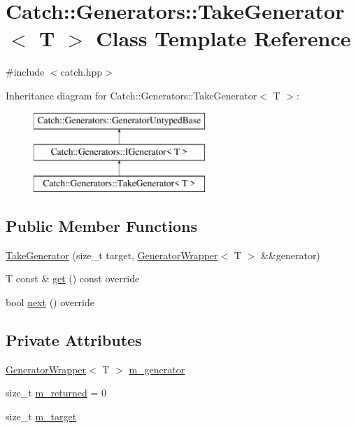\hypertarget{class_catch_1_1_generators_1_1_take_generator}{}\section{Catch\+::Generators\+::Take\+Generator$<$ T $>$ Class Template Reference}
\label{class_catch_1_1_generators_1_1_take_generator}


{\ttfamily \#include $<$catch.\+hpp$>$}

Inheritance diagram for Catch\+::Generators\+::Take\+Generator$<$ T $>$\+:\begin{figure}[H]
\begin{center}
\leavevmode
\includegraphics[height=3.000000cm]{class_catch_1_1_generators_1_1_take_generator}
\end{center}
\end{figure}
\subsection*{Public Member Functions}
\begin{DoxyCompactItemize}
\item 
\mbox{\hyperlink{class_catch_1_1_generators_1_1_take_generator_aacef789c01a86246249c88a184268c65}{Take\+Generator}} (size\+\_\+t target, \mbox{\hyperlink{class_catch_1_1_generators_1_1_generator_wrapper}{Generator\+Wrapper}}$<$ T $>$ \&\&generator)
\item 
T const  \& \mbox{\hyperlink{class_catch_1_1_generators_1_1_take_generator_aa4d2560f2066ec2eb4a351d62c107c78}{get}} () const override
\item 
bool \mbox{\hyperlink{class_catch_1_1_generators_1_1_take_generator_ae343f3e28fe04e0a20d6fdf69bfb4c78}{next}} () override
\end{DoxyCompactItemize}
\subsection*{Private Attributes}
\begin{DoxyCompactItemize}
\item 
\mbox{\hyperlink{class_catch_1_1_generators_1_1_generator_wrapper}{Generator\+Wrapper}}$<$ T $>$ \mbox{\hyperlink{class_catch_1_1_generators_1_1_take_generator_a2193ff62cd0fe809049b6d6b2f399d89}{m\+\_\+generator}}
\item 
size\+\_\+t \mbox{\hyperlink{class_catch_1_1_generators_1_1_take_generator_a1014eb709685999a1b6aeed05b4dd978}{m\+\_\+returned}} = 0
\item 
size\+\_\+t \mbox{\hyperlink{class_catch_1_1_generators_1_1_take_generator_a8ad16c4baed05b024a86a9c87c9cd0a7}{m\+\_\+target}}
\end{DoxyCompactItemize}
